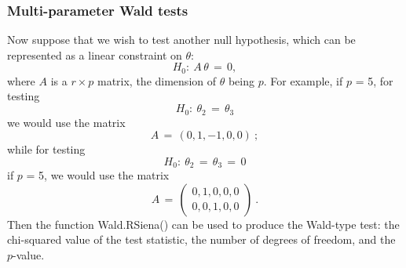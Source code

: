 \documentclass[a4paper,fleqn,11pt]{article}
\newcommand{\+}{\, + \,}
\newcommand{\sfn}[1]{\textsf{#1}}
\begin{document}
\subsubsection{Multi-parameter Wald tests}

Now suppose that we wish to test another null hypothesis,
which can be represented as a linear constraint on $\theta$:
\[
H_0 : \ A\,\theta \,=\, 0 ,
\]
where $A$ is a $r \times p$ matrix, the dimension of $\theta$ being $p$.
For example, if $p$ = 5, for testing
\[
H_0 : \ \theta_2 \,=\, \theta_3
\]
we would use the matrix
\[
   A \,=\, (0, 1, -1, 0, 0) \ ;
\]
while for testing
\[
H_0 : \ \theta_2 \,=\, \theta_3 \,=\, 0
\]
if $p$ = 5, we would use the matrix
\[
   A \,=\, \left( \begin{array}{l} 0, 1, 0, 0, 0 \\
                                   0, 0, 1, 0, 0
                  \end{array} \right) \ .
\]
Then the function \sfn{Wald.RSiena()}
can be used to produce
the Wald-type test: the chi-squared value of the
test statistic, the number of degrees of freedom, and the $p$-value.
\end{document}
